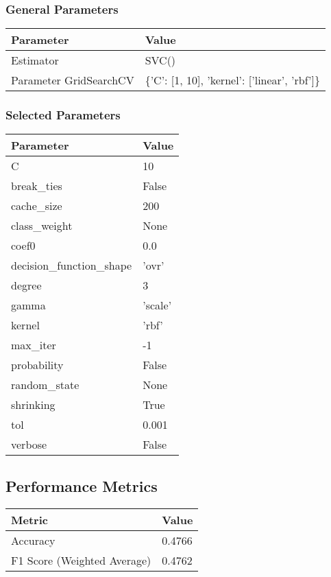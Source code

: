 \documentclass{article}
\begin{document}
\subsubsection*{General Parameters}
\begin{tabular}{|l|l|}
\hline
\textbf{Parameter} & \textbf{Value} \\ \hline
Estimator & SVC() \\ \hline
Parameter GridSearchCV & \{'C': [1, 10], 'kernel': ['linear', 'rbf']\} \\ \hline
\end{tabular}

\subsubsection*{Selected Parameters}
\begin{tabular}{|l|l|}
\hline
\textbf{Parameter} & \textbf{Value} \\ \hline
C & 10 \\ \hline
break\_ties & False \\ \hline
cache\_size & 200 \\ \hline
class\_weight & None \\ \hline
coef0 & 0.0 \\ \hline
decision\_function\_shape & 'ovr' \\ \hline
degree & 3 \\ \hline
gamma & 'scale' \\ \hline
kernel & 'rbf' \\ \hline
max\_iter & -1 \\ \hline
probability & False \\ \hline
random\_state & None \\ \hline
shrinking & True \\ \hline
tol & 0.001 \\ \hline
verbose & False \\ \hline
\end{tabular}

\subsection*{Performance Metrics}
\begin{tabular}{|l|l|}
\hline
\textbf{Metric} & \textbf{Value} \\ \hline
Accuracy & 0.4766 \\ \hline
F1 Score (Weighted Average) & 0.4762 \\ \hline
\end{tabular}
\end{document}
